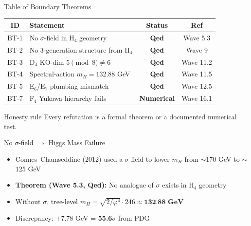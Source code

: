 \documentclass[aspectratio=169,11pt]{beamer}
\newcommand{\ph}{\varphi}
\begin{document}
\begin{frame}{Table of Boundary Theorems}
  \begin{center}
    \begin{tabular}{clcc}
      \toprule
      ID & Statement & Status & Ref \\
      \midrule
      BT-1 & No $\sigma$-field in H$_4$ geometry & \textbf{Qed} & Wave 5.3 \\
      BT-2 & No 3-generation structure from H$_4$ & \textbf{Qed} & Wave 9 \\
      BT-3 & D$_4$ KO-dim $5 \pmod 8 \neq 6$ & \textbf{Qed} & Wave 11.2 \\
      BT-4 & Spectral-action $m_H = 132.88$ GeV & \textbf{Qed} & Wave 11.5 \\
      BT-5 & E$_6$/E$_7$ plumbing mismatch & \textbf{Qed} & Wave 12.5 \\
      BT-7 & F$_4$ Yukawa hierarchy fails & \textbf{Numerical} & Wave 16.1 \\
      \bottomrule
    \end{tabular}
  \end{center}
  \vfill
  \begin{block}{Honesty rule}
    Every refutation is a formal theorem or a documented numerical test.
  \end{block}
\end{frame}

\begin{frame}{No $\sigma$-field $\Rightarrow$ Higgs Mass Failure}
  \begin{itemize}
    \item Connes--Chamseddine (2012) used a $\sigma$-field to lower $m_H$ from $\sim$170 GeV to $\sim$125 GeV
    \item \textbf{Theorem (Wave 5.3, Qed):} No analogue of $\sigma$ exists in H$_4$ geometry
    \item Without $\sigma$, tree-level $m_H = \sqrt{2/\ph^4}\cdot 246 \approx \textbf{132.88 GeV}$
    \item Discrepancy: $+7.78$ GeV = \textbf{55.6$\sigma$} from PDG
  \end{itemize}
  \vfill
  \begin{center}
  \end{center}
\end{frame}
\end{document}
